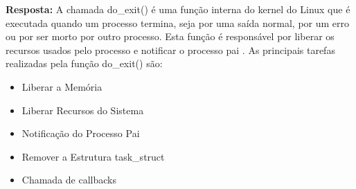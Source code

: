 \documentclass{article}
\begin{document}
\textbf{Resposta:} A chamada do\_exit() é uma função interna do kernel do Linux que é executada quando um processo termina, seja por uma saída normal, por um erro ou por ser morto por outro processo. Esta função é responsável por liberar os recursos usados pelo processo e notificar o processo pai \parencite[p. 62]{tanenbaum2021}. As principais tarefas realizadas pela função do\_exit() são:

\begin{itemize}
  \item Liberar a Memória
  \item Liberar Recursos do Sistema
  \item Notificação do Processo Pai
  \item Remover a Estrutura task\_struct
  \item Chamada de callbacks
\end{itemize}

\printbibliography %
\end{document}
